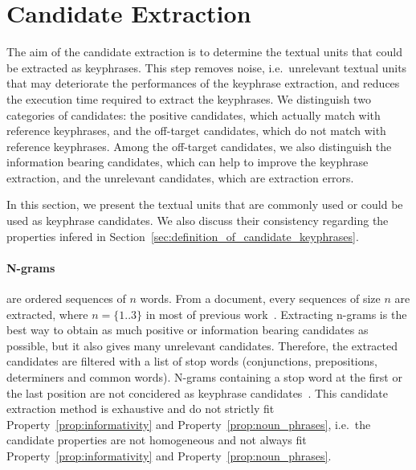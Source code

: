 \section{Candidate Extraction}
\label{sec:candidate_extraction}
  The aim of the candidate extraction is to determine the textual units that
  could be extracted as keyphrases. This step removes noise, i.e.~unrelevant
  textual units that may deteriorate the performances of the keyphrase
  extraction, and reduces the execution time required to extract the keyphrases.
  We distinguish two categories of candidates: the positive candidates, which
  actually match with reference keyphrases, and the off-target candidates, which
  do not match with reference keyphrases. Among the off-target candidates, we
  also distinguish the information bearing candidates, which can help to improve
  the keyphrase extraction, and the unrelevant candidates, which are extraction
  errors.

  In this section, we present the textual units that are commonly used or could
  be used as keyphrase candidates. We also discuss their consistency regarding
  the properties infered in
  Section~\ref{sec:definition_of_candidate_keyphrases}.

  \paragraph{N-grams} are ordered sequences of $n$ words. From a document, every
  sequences of size $n$ are extracted, where $n = \{1..3\}$ in most of previous
  work~\cite{witten1999kea,turney1999learningalgorithms,hulth2003keywordextraction}.
  Extracting n-grams is the best way to obtain as much positive or information
  bearing candidates as possible, but it also gives many unrelevant candidates.
  Therefore, the extracted candidates are filtered with a list of stop words
  (conjunctions, prepositions, determiners  and common words). N-grams
  containing a stop word at the first or the last position are not concidered as
  keyphrase candidates~\cite{witten1999kea}. This candidate extraction method is
  exhaustive and do not strictly fit Property~\ref{prop:informativity} and
  Property~\ref{prop:noun_phrases}, i.e.~the candidate properties are not
  homogeneous and not always fit Property~\ref{prop:informativity} and
  Property~\ref{prop:noun_phrases}.

